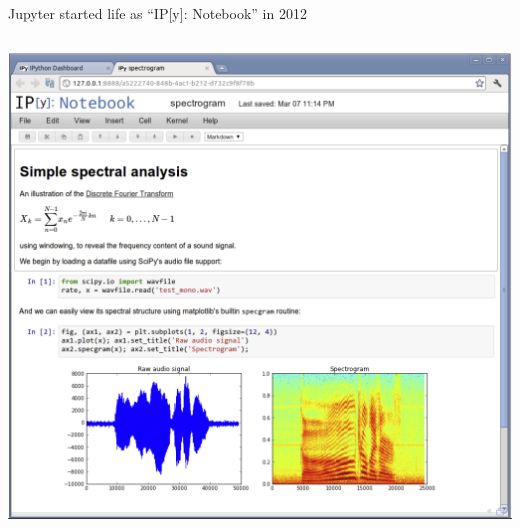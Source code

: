 \documentclass[aspectratio=169]{beamer}
\begin{document}
\begin{frame}{Jupyter started life as ``IP[y]: Notebook'' in 2012}
\vspace{0.2 cm}
\begin{columns}
\includegraphics[width=\linewidth]{img/screenshot-2012-ipython-notebook.png}
\end{columns}
\end{frame}
\end{document}
